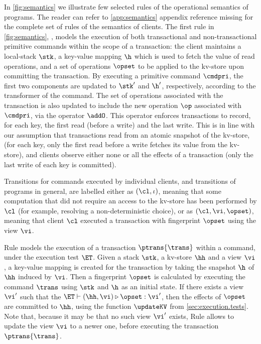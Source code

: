 In \cref{fig:semantics} we illustrate few selected rules of the operational semantics of programs. 
The reader can refer to \cref{app:semantics} {\color{red} appendix reference missing} 
for the complete set of rules of the semantics of clients. 
The first rule in \cref{fig:semantics}, , models the execution of both transactional and 
non-transactional primitive commands within the scope of a transaction: the client maintains 
a local-stack $\stk$, a key-value mapping $\h$ which is used to fetch the value of read operations, 
and a set of operations $\opset$ to be applied to the kv-store upon committing the transaction. 
By executing a primitive command $\cmdpri$,  the first two components are updated to $\stk'$ and 
$\h'$, respectively, according to the transformer of the command. The set of operations associated with 
the transaction is also updated to include the new operation $\op$ associated with $\cmdpri$, 
via the operator $\addO$. This operator enforces transactions to record, for each key, the first 
read (before a write) and the last write. This is in line with our assumption that transactions read from an atomic 
snapshot of the kv-store,
(for each key, only the first read before a write fetches its value from the kv-store), 
and clients observe either none or all the effects of a transaction (only the last write of each key is committed).

Transitions for commands executed by individual clients, and transitions of programs in general, are labelled 
either as $(\cl, \iota)$, meaning that some computation that did not require an access to the kv-store 
has been performed by $\cl$ (for example, resolving a non-deterministic choice), or as 
$(\cl, \vi, \opset)$, meaning that client $\cl$ executed a transaction with fingerprint $\opset$ using 
the view $\vi$.
 
Rule  models the execution of a transaction $\ptrans{\trans}$ within a command, under the execution 
test $\ET$. Given a stack $\stk$, a 
kv-store $\hh$ and a view $\vi$, a key-value mapping is created for the transaction by taking the 
snapshot $\h$ of $\hh$ induced by $\vi$. Then a fingerprint $\opset$ is calculated by executing the command $\trans$ using 
$\stk$ and $\h$ as an initial state. If there exists a view $\vi'$ such that the $\ET \vdash (\hh, \vi) \triangleright \opset : \vi'$, 
then the effects of $\opset$ are committed to $\hh$, using the function $\updateKV$ from \cref{sec:execution.tests}. 
Note that, because it may be that no such view $\vi'$ exists, Rule  allows to update the view $\vi$ to a 
newer one, before executing the transaction $\ptrans{\trans}$.

